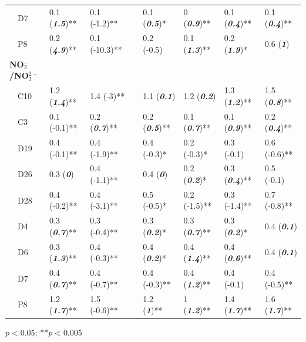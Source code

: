 \documentclass[letterpaper,12pt,oneside]{article}\usepackage[]{graphicx}\usepackage[]{color}
\begin{document}
\begin{table}[!tbp]
\begin{center}
\begin{tabular}{lllcllll}
~~D7&0.1 \footnotesize{(\textit{\textbf{1.5}})**}&0.1 \footnotesize{(-1.2)**}&&0.1 \footnotesize{(\textit{\textbf{0.5}})*}&0 \footnotesize{(\textit{\textbf{0.9}})**}&0.1 \footnotesize{(\textit{\textbf{0.4}})**}&0.1 \footnotesize{(\textit{\textbf{0.4}})**}\tabularnewline
~~P8&0.2 \footnotesize{(\textit{\textbf{4.9}})**}&0.1 \footnotesize{(-10.3)**}&&0.2 \footnotesize{(-0.5)}&0.1 \footnotesize{(\textit{\textbf{1.3}})**}&0.2 \footnotesize{(\textit{\textbf{1.9}})*}&0.6 \footnotesize{(\textit{\textbf{1}})}\tabularnewline
\hline
{\bfseries NO$_{2}^{-}$/NO$_{3}^{2-}$}&&&&&&&\tabularnewline
~~C10&1.2 \footnotesize{(\textit{\textbf{1.4}})**}&1.4 \footnotesize{(-3)**}&&1.1 \footnotesize{(\textit{\textbf{0.1}})}&1.2 \footnotesize{(\textit{\textbf{0.2}})}&1.3 \footnotesize{(\textit{\textbf{1.2}})**}&1.5 \footnotesize{(\textit{\textbf{0.8}})**}\tabularnewline
~~C3&0.1 \footnotesize{(-0.1)**}&0.2 \footnotesize{(\textit{\textbf{0.7}})**}&&0.2 \footnotesize{(\textit{\textbf{0.5}})**}&0.1 \footnotesize{(\textit{\textbf{0.7}})**}&0.1 \footnotesize{(\textit{\textbf{0.9}})**}&0.2 \footnotesize{(\textit{\textbf{0.4}})**}\tabularnewline
~~D19&0.4 \footnotesize{(-0.1)**}&0.4 \footnotesize{(-1.9)**}&&0.4 \footnotesize{(-0.3)*}&0.2 \footnotesize{(-0.3)*}&0.3 \footnotesize{(-0.1)}&0.6 \footnotesize{(-0.6)**}\tabularnewline
~~D26&0.3 \footnotesize{(\textit{\textbf{0}})}&0.4 \footnotesize{(-1.1)**}&&0.4 \footnotesize{(\textit{\textbf{0}})}&0.2 \footnotesize{(\textit{\textbf{0.2}})*}&0.3 \footnotesize{(\textit{\textbf{0.4}})**}&0.5 \footnotesize{(-0.1)}\tabularnewline
~~D28&0.4 \footnotesize{(-0.2)**}&0.4 \footnotesize{(-3.1)**}&&0.5 \footnotesize{(-0.5)*}&0.2 \footnotesize{(-1.5)**}&0.3 \footnotesize{(-1.4)**}&0.7 \footnotesize{(-0.8)**}\tabularnewline
~~D4&0.3 \footnotesize{(\textit{\textbf{0.7}})**}&0.3 \footnotesize{(-0.4)**}&&0.3 \footnotesize{(\textit{\textbf{0.2}})*}&0.3 \footnotesize{(\textit{\textbf{0.7}})**}&0.3 \footnotesize{(\textit{\textbf{0.2}})*}&0.4 \footnotesize{(\textit{\textbf{0.1}})}\tabularnewline
~~D6&0.3 \footnotesize{(\textit{\textbf{1.3}})**}&0.4 \footnotesize{(-0.3)**}&&0.4 \footnotesize{(\textit{\textbf{0.2}})*}&0.4 \footnotesize{(\textit{\textbf{1.4}})**}&0.4 \footnotesize{(\textit{\textbf{0.6}})**}&0.4 \footnotesize{(\textit{\textbf{0.1}})}\tabularnewline
~~D7&0.4 \footnotesize{(\textit{\textbf{0.7}})**}&0.4 \footnotesize{(-0.7)**}&&0.4 \footnotesize{(-0.3)**}&0.4 \footnotesize{(\textit{\textbf{1.2}})**}&0.4 \footnotesize{(-0.1)}&0.4 \footnotesize{(-0.5)**}\tabularnewline
~~P8&1.2 \footnotesize{(\textit{\textbf{1.7}})**}&1.5 \footnotesize{(-0.6)**}&&1.2 \footnotesize{(\textit{\textbf{1}})**}&1 \footnotesize{(\textit{\textbf{1.2}})**}&1.4 \footnotesize{(\textit{\textbf{1.7}})**}&1.6 \footnotesize{(\textit{\textbf{1.7}})**}\tabularnewline
\hline
\end{tabular}\end{center}

\footnotesize *$p<0.05$; **$p<0.005$\end{table}
\end{document}
